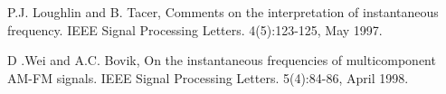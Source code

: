 \documentclass[10pt]{report} %
\begin{document}
\begin{thebibliography}{1}

{\footnotesize

 P.J. Loughlin and B. Tacer, Comments on the interpretation of instantaneous frequency. IEEE Signal Processing Letters. 4(5):123-125, May 1997.

 D .Wei and A.C. Bovik, On the instantaneous frequencies of multicomponent AM-FM signals. IEEE Signal Processing Letters. 5(4):84-86, April 1998.

}

\end{thebibliography}
\end{document}
